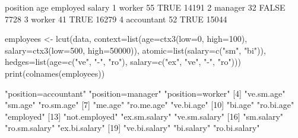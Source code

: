 \begin{Schunk}
% --begin: "lcut.data.frame2"
\begin{Soutput}
    position age employed salary
1     worker  55     TRUE  14191
2    manager  32    FALSE   7728
3     worker  41     TRUE  16279
4 accountant  52     TRUE  15044
\end{Soutput}
\begin{Sinput}
 employees <- lcut(data,
                   context=list(age=ctx3(low=0, high=100),
                                salary=ctx3(low=500, high=50000)),
                   atomic=list(salary=c("sm", "bi")),
                   hedges=list(age=c("ve", "-", "ro"),
                               salary=c("ex", "ve", "-", "ro")))
 print(colnames(employees))
\end{Sinput}
\begin{Soutput}
 [1] "position=accountant" "position=manager"    "position=worker"    
 [4] "ve.sm.age"           "sm.age"              "ro.sm.age"          
 [7] "me.age"              "ro.me.age"           "ve.bi.age"          
[10] "bi.age"              "ro.bi.age"           "employed"           
[13] "not.employed"        "ex.sm.salary"        "ve.sm.salary"       
[16] "sm.salary"           "ro.sm.salary"        "ex.bi.salary"       
[19] "ve.bi.salary"        "bi.salary"           "ro.bi.salary"       
\end{Soutput}
%
% --end: "lcut.data.frame2"
\end{Schunk}
